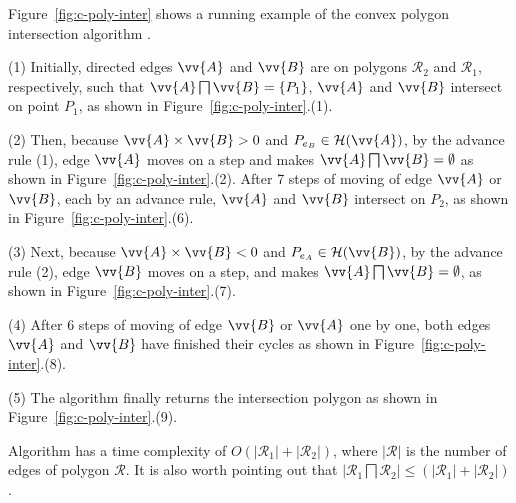 \begin{example}
Figure~\ref{fig:c-poly-inter} shows a running example of the convex polygon intersection algorithm \cpia.

\sstab(1) Initially, directed edges $\vv{A}$ and $\vv{B}$ are on polygons $\mathcal{R}_2$ and $\mathcal{R}_1$, respectively, such that $\vv{A} \bigsqcap \vv{B} = \{P_1\}$, \ie $\vv{A}$ and $\vv{B}$ intersect on point $P_1$, as shown in Figure~\ref{fig:c-poly-inter}.(1).

\sstab(2) Then, because $\vv{A} \times \vv{B} > 0$ and $P_{e_B} \in \mathcal{H}(\vv{A})$, by the advance rule (1), edge $\vv{A}$ moves on a step and makes $\vv{A} \bigsqcap \vv{B} = \emptyset$ as shown in Figure~\ref{fig:c-poly-inter}.(2).
After 7 steps of moving of edge $\vv{A}$ or $\vv{B}$, each by an advance rule, $\vv{A}$ and $\vv{B}$ intersect on $P_2$, as shown in Figure~\ref{fig:c-poly-inter}.(6).

\sstab(3) Next, because $\vv{A} \times \vv{B} < 0$ and $P_{e_A} \in \mathcal{H}(\vv{B})$, by the advance rule (2), edge $\vv{B}$ moves on a step, and makes $\vv{A} \bigsqcap \vv{B} = \emptyset$, as shown in Figure~\ref{fig:c-poly-inter}.(7).

\sstab(4) After 6 steps of moving of edge $\vv{B}$ or $\vv{A}$ one by one, both edges $\vv{A}$ and $\vv{B}$ have finished their cycles as shown in Figure~\ref{fig:c-poly-inter}.(8).

\sstab(5) The algorithm finally returns the intersection polygon as shown in Figure~\ref{fig:c-poly-inter}.(9). \eop
\end{example}


Algorithm  \cpia has a time complexity of $O(|\mathcal{R}_1| + |\mathcal{R}_2|)$, where $|\mathcal{R}|$ is the number of edges of polygon $\mathcal{R}$.
It is also worth pointing out that $|\mathcal{R}_1 \bigsqcap \mathcal{R}_2| \le (|\mathcal{R}_1| + |\mathcal{R}_2|)$.








